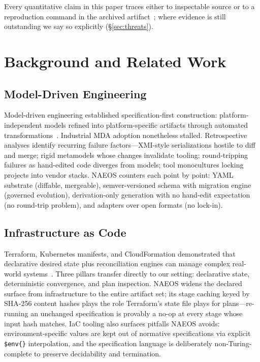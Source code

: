 \documentclass[sigconf,nonacm]{acmart}
\begin{document}
Every quantitative claim in this paper traces either to inspectable source or to a reproduction command in the archived artifact~\cite{naeos2026artifact}; where evidence is still outstanding we say so explicitly (\S\ref{sec:threats}).

\section{Background and Related Work}
\label{sec:related}

\subsection{Model-Driven Engineering}
Model-driven engineering established specification-first construction: platform-independent models refined into platform-specific artifacts through automated transformations~\cite{schmidt2006mde}. Industrial MDA adoption nonetheless stalled. Retrospective analyses identify recurring failure factors---XMI-style serializations hostile to diff and merge; rigid metamodels whose changes invalidate tooling; round-tripping failures as hand-edited code diverges from models; tool monocultures locking projects into vendor stacks. NAEOS counters each point by point: YAML substrate (diffable, mergeable), semver-versioned schema with migration engine (governed evolution), derivation-only generation with no hand-edit expectation (no round-trip problem), and adapters over open formats (no lock-in).

\subsection{Infrastructure as Code}
Terraform, Kubernetes manifests, and CloudFormation demonstrated that declarative desired state plus reconciliation engines can manage complex real-world systems~\cite{kugler2018iac}. Three pillars transfer directly to our setting: declarative state, deterministic convergence, and plan inspection. NAEOS widens the declared surface from infrastructure to the entire artifact set; its stage caching keyed by SHA-256 content hashes plays the role Terraform's state file plays for plans---re-running an unchanged specification is provably a no-op at every stage whose input hash matches. IaC tooling also surfaces pitfalls NAEOS avoids: environment-specific values are kept out of normative specifications via explicit \texttt{\$env\{\}} interpolation, and the specification language is deliberately non-Turing-complete to preserve decidability and termination.
\end{document}
